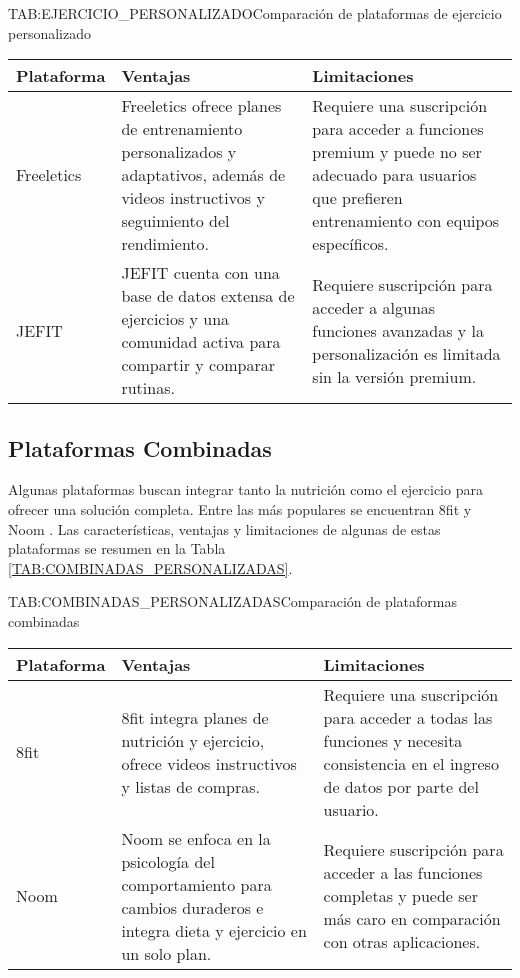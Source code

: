 \begin{table}[Plataformas de Ejercicio Personalizado]{TAB:EJERCICIO_PERSONALIZADO}{Comparación de plataformas de ejercicio personalizado}
  \begin{tabular}{|p{3cm}|p{5cm}|p{5cm}|}
    \hline
    \textbf{Plataforma} & \textbf{Ventajas} & \textbf{Limitaciones} \\
    \hline
    Freeletics & Freeletics ofrece planes de entrenamiento personalizados y adaptativos, además de videos instructivos y seguimiento del rendimiento. & Requiere una suscripción para acceder a funciones premium y puede no ser adecuado para usuarios que prefieren entrenamiento con equipos específicos. \\
    \hline
    JEFIT & JEFIT cuenta con una base de datos extensa de ejercicios y una comunidad activa para compartir y comparar rutinas. & Requiere suscripción para acceder a algunas funciones avanzadas y la personalización es limitada sin la versión premium. \\
    \hline
  \end{tabular}
\end{table}

\subsection{Plataformas Combinadas}

Algunas plataformas buscan integrar tanto la nutrición como el ejercicio para ofrecer una solución completa. Entre las más populares se encuentran 8fit \cite{8fit} y Noom \cite{Noom}. Las características, ventajas y limitaciones de algunas de estas plataformas se resumen en la Tabla \ref{TAB:COMBINADAS_PERSONALIZADAS}.

\begin{table}[Plataformas Combinadas]{TAB:COMBINADAS_PERSONALIZADAS}{Comparación de plataformas combinadas}
  \begin{tabular}{|p{3cm}|p{5cm}|p{5cm}|}
    \hline
    \textbf{Plataforma} & \textbf{Ventajas} & \textbf{Limitaciones} \\
    \hline
    8fit & 8fit integra planes de nutrición y ejercicio, ofrece videos instructivos y listas de compras. & Requiere una suscripción para acceder a todas las funciones y necesita consistencia en el ingreso de datos por parte del usuario. \\
    \hline
    Noom & Noom se enfoca en la psicología del comportamiento para cambios duraderos e integra dieta y ejercicio en un solo plan. & Requiere suscripción para acceder a las funciones completas y puede ser más caro en comparación con otras aplicaciones. \\
    \hline
  \end{tabular}
\end{table}

